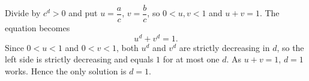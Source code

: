 Divide by $c^d>0$ and put $u=\dfrac {a}{c}$, $v=\dfrac {b}{c}$, so $0<u,v<1$ and $u+v=1$. The equation becomes
\[
u^d+v^d=1 .
\]
Since $0<u<1$ and $0<v<1$, both $u^d$ and $v^d$ are strictly decreasing in $d$, so the left side is strictly decreasing and equals $1$ for at most one $d$. As $u+v=1$, $d=1$ works. Hence the only solution is $\boxed{d=1}$.
